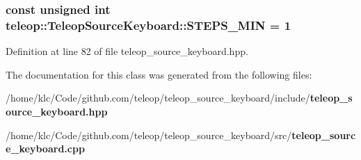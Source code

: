 \subsubsection[{STEPS\_\-MIN}]{\setlength{\rightskip}{0pt plus 5cm}const unsigned int {\bf teleop::TeleopSourceKeyboard::STEPS\_\-MIN} = 1\hspace{0.3cm}{\ttfamily  [static]}}\label{classteleop_1_1TeleopSourceKeyboard_a13a423ce5ce0d7358f9c6b5d0d820dde}


Definition at line 82 of file teleop\_\-source\_\-keyboard.hpp.



The documentation for this class was generated from the following files:\begin{DoxyCompactItemize}
\item 
/home/klc/Code/github.com/teleop/teleop\_\-source\_\-keyboard/include/{\bf teleop\_\-source\_\-keyboard.hpp}\item 
/home/klc/Code/github.com/teleop/teleop\_\-source\_\-keyboard/src/{\bf teleop\_\-source\_\-keyboard.cpp}\end{DoxyCompactItemize}
